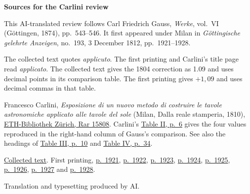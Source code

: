 \clearpage\thispagestyle{empty}
\begin{center}\textbf{Sources for the Carlini review}\end{center}
\noindent This AI-translated review follows Carl Friedrich Gauss, \textit{Werke}, vol.~VI (Göttingen, 1874), pp.~543--546. It first appeared under Milan in \textit{Göttingische gelehrte Anzeigen}, no.~193, 3 December 1812, pp.~1921--1928.
\par\smallskip\noindent The collected text quotes \textit{applicuto}. The first printing and Carlini's title page read \textit{applicato}. The collected text gives the 1804 correction as 1.09 and uses decimal points in its comparison table. The first printing gives \(+1{,}09\) and uses decimal commas in that table.
\par\smallskip\noindent Francesco Carlini, \textit{Esposizione di un nuovo metodo di costruire le tavole astronomiche applicato alle tavole del sole} (Milan, Dalla reale stamperia, 1810), \href{https://doi.org/10.3931/e-rara-49134}{ETH-Bibliothek Zürich, Rar 15808}. Carlini's \href{https://www.e-rara.ch/i3f/v20/13473455/full/1650,/0/default.jpg}{Table II, p.~6} gives the four values reproduced in the right-hand column of Gauss's comparison. See also the headings of \href{https://www.e-rara.ch/i3f/v20/13473459/full/1650,/0/default.jpg}{Table III, p.~10} and \href{https://www.e-rara.ch/i3f/v20/13473483/full/1650,/0/default.jpg}{Table IV, p.~34}.
\par\smallskip\noindent \href{https://gdz.sub.uni-goettingen.de/id/PPN236007467}{Collected text}. First printing, \href{https://images.p.sub.uni-goettingen.de/iiif/image/gdz:PPN319721507_1812:00001965/full/1650,/0/default.jpg}{p.~1921}, \href{https://images.p.sub.uni-goettingen.de/iiif/image/gdz:PPN319721507_1812:00001966/full/1650,/0/default.jpg}{p.~1922}, \href{https://images.p.sub.uni-goettingen.de/iiif/image/gdz:PPN319721507_1812:00001967/full/1650,/0/default.jpg}{p.~1923}, \href{https://images.p.sub.uni-goettingen.de/iiif/image/gdz:PPN319721507_1812:00001968/full/1650,/0/default.jpg}{p.~1924}, \href{https://images.p.sub.uni-goettingen.de/iiif/image/gdz:PPN319721507_1812:00001969/full/1650,/0/default.jpg}{p.~1925}, \href{https://images.p.sub.uni-goettingen.de/iiif/image/gdz:PPN319721507_1812:00001970/full/1650,/0/default.jpg}{p.~1926}, \href{https://images.p.sub.uni-goettingen.de/iiif/image/gdz:PPN319721507_1812:00001971/full/1650,/0/default.jpg}{p.~1927} and \href{https://images.p.sub.uni-goettingen.de/iiif/image/gdz:PPN319721507_1812:00001972/full/1650,/0/default.jpg}{p.~1928}.
\par\smallskip\noindent Translation and typesetting produced by AI.
\clearpage

